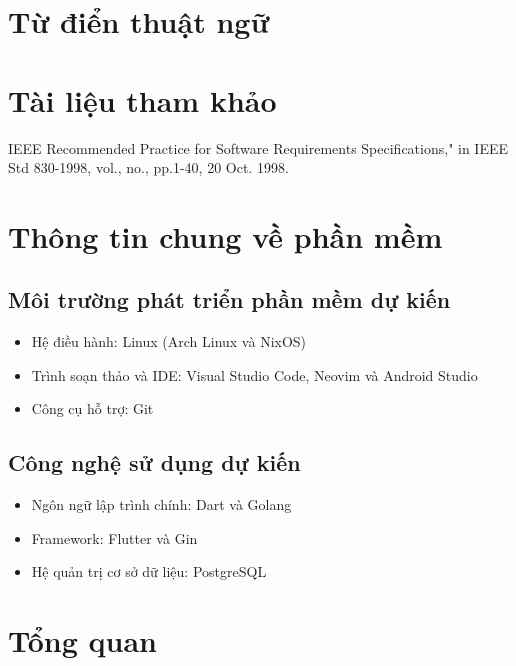 \section{Từ điển thuật ngữ}

\section{Tài liệu tham khảo}

\begin{thebibliography}{9}
    IEEE Recommended Practice for Software Requirements Specifications," in IEEE Std 830-1998, vol., no., pp.1-40, 20 Oct. 1998.

\end{thebibliography}

\section{Thông tin chung về phần mềm}

\subsection{Môi trường phát triển phần mềm dự kiến}

\begin{itemize}
    \item Hệ điều hành: Linux (Arch Linux và NixOS)
    \item Trình soạn thảo và IDE: Visual Studio Code, Neovim và Android Studio
    \item Công cụ hỗ trợ: Git 
\end{itemize}

\subsection{Công nghệ sử dụng dự kiến}

\begin{itemize}
    \item Ngôn ngữ lập trình chính: Dart và Golang
    \item Framework: Flutter và Gin
    \item Hệ quản trị cơ sở dữ liệu: PostgreSQL
\end{itemize}

\section{Tổng quan}


